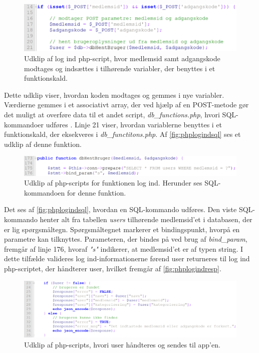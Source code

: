 \begin{figure} [H]
\centering
\includegraphics[width=1\textwidth]{figures/imple/phplogind}
\caption{Udklip af log ind php-script, hvor medlemsid samt adgangskode modtages og indsættes i tilhørende variabler, der benyttes i et funktionskald.}
\label{fig:phplogind}
\end{figure}

\noindent
Dette udklip viser, hvordan koden modtages og gemmes i nye variabler. Værdierne gemmes i et associativt array, der ved hjælp af en POST-metode gør det muligt at overføre data til et andet script, \textit{db\_functions.php}, hvori SQL-kommandoer udføres \cite{w3schools2017}. Linje 21 viser, hvordan variablerne benyttes i et funktionskald, der eksekveres i \textit{db\_functitons.php}. Af \autoref{fig:phplogindsql} ses et udklip af denne funktion.

\begin{figure} [H]
\centering
\includegraphics[width=1\textwidth]{figures/imple/phplogindsql}
\caption{Udklip af php-scripts for funktionen log ind. Herunder ses SQL-kommandoen for denne funktion.}
\label{fig:phplogindsql}
\end{figure}

\noindent
Det ses af \autoref{fig:phplogindsql}, hvordan en SQL-kommando udføres. Den viste SQL-kommando henter alt fra tabellen \textit{users} tilhørende medlemsid'et i databasen, der er lig spørgsmåltegn. Spørgsmåltegnet markerer et bindingspunkt, hvorpå en parametre kan tilknyttes. Parameteren, der bindes på ved brug af \textit{bind\_param}, fremgår af linje 176, hvoraf \textit{"s"} indikerer, at medlemsid'et er af typen string. I dette tilfælde valideres log ind-informationerne førend user returneres til log ind php-scriptet, der håndterer user, hvilket fremgår af \autoref{fig:phplogindresp}.


\begin{figure} [H]
\centering
\includegraphics[width=1\textwidth]{figures/imple/phplogindresp}
\caption{Udklip af php-scripts, hvori user håndteres og sendes til app'en.}
\label{fig:phplogindresp}
\end{figure}

